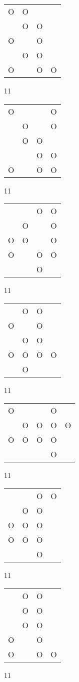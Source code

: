 \begin{tabular}{|m{0.2cm}m{0.2cm}m{0.2cm}m{0.2cm}|}\hline
O&O& & \\
 &O&O& \\
O& &O& \\
 &O&O& \\
O& &O&O\\
\hline\end{tabular}11
\begin{tabular}{|m{0.2cm}m{0.2cm}m{0.2cm}m{0.2cm}|}\hline
O& & &O\\
 &O& &O\\
 &O&O& \\
 & &O&O\\
O& &O&O\\
\hline\end{tabular}11
\begin{tabular}{|m{0.2cm}m{0.2cm}m{0.2cm}m{0.2cm}|}\hline
 & &O&O\\
 &O& &O\\
O&O& &O\\
O& &O&O\\
 & &O& \\
\hline\end{tabular}11
\begin{tabular}{|m{0.2cm}m{0.2cm}m{0.2cm}m{0.2cm}|}\hline
 &O&O& \\
O& &O& \\
 &O&O& \\
O&O&O&O\\
 &O& & \\
\hline\end{tabular}11
\begin{tabular}{|m{0.2cm}m{0.2cm}m{0.2cm}m{0.2cm}m{0.2cm}|}\hline
O& & &O& \\
 &O&O&O&O\\
O&O&O&O& \\
 & & &O& \\
\hline\end{tabular}11
\begin{tabular}{|m{0.2cm}m{0.2cm}m{0.2cm}m{0.2cm}|}\hline
 & &O&O\\
 &O&O& \\
O&O&O& \\
O&O&O& \\
 & &O& \\
\hline\end{tabular}11
\begin{tabular}{|m{0.2cm}m{0.2cm}m{0.2cm}m{0.2cm}|}\hline
 &O&O& \\
 &O&O& \\
 &O&O& \\
O& &O& \\
O& &O&O\\
\hline\end{tabular}11
